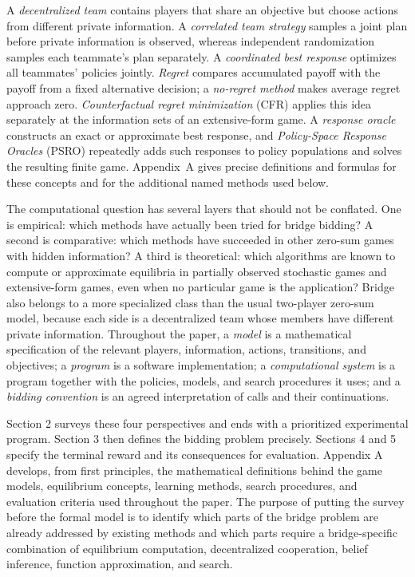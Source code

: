 \documentclass[11pt]{article}
\begin{document}
A \emph{decentralized team} contains players that share an objective but choose actions from different private information. A \emph{correlated team strategy} samples a joint plan before private information is observed, whereas independent randomization samples each teammate's plan separately. A \emph{coordinated best response} optimizes all teammates' policies jointly. \emph{Regret} compares accumulated payoff with the payoff from a fixed alternative decision; a \emph{no-regret method} makes average regret approach zero. \emph{Counterfactual regret minimization} (CFR) applies this idea separately at the information sets of an extensive-form game. A \emph{response oracle} constructs an exact or approximate best response, and \emph{Policy-Space Response Oracles} (PSRO) repeatedly adds such responses to policy populations and solves the resulting finite game. Appendix~A gives precise definitions and formulas for these concepts and for the additional named methods used below.

The computational question has several layers that should not be conflated. One is empirical: which methods have actually been tried for bridge bidding? A second is comparative: which methods have succeeded in other zero-sum games with hidden information? A third is theoretical: which algorithms are known to compute or approximate equilibria in partially observed stochastic games and extensive-form games, even when no particular game is the application? Bridge also belongs to a more specialized class than the usual two-player zero-sum model, because each side is a decentralized team whose members have different private information. Throughout the paper, a \emph{model} is a mathematical specification of the relevant players, information, actions, transitions, and objectives; a \emph{program} is a software implementation; a \emph{computational system} is a program together with the policies, models, and search procedures it uses; and a \emph{bidding convention} is an agreed interpretation of calls and their continuations.

Section 2 surveys these four perspectives and ends with a prioritized experimental program. Section 3 then defines the bidding problem precisely. Sections 4 and 5 specify the terminal reward and its consequences for evaluation. Appendix A develops, from first principles, the mathematical definitions behind the game models, equilibrium concepts, learning methods, search procedures, and evaluation criteria used throughout the paper. The purpose of putting the survey before the formal model is to identify which parts of the bridge problem are already addressed by existing methods and which parts require a bridge-specific combination of equilibrium computation, decentralized cooperation, belief inference, function approximation, and search.
\end{document}
